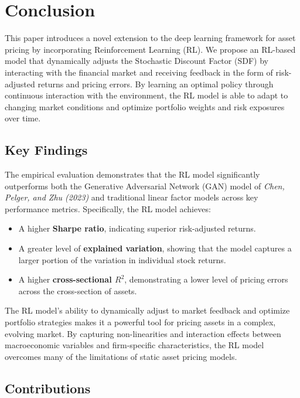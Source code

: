 \section{Conclusion}

This paper introduces a novel extension to the deep learning framework for asset pricing by incorporating Reinforcement Learning (RL). We propose an RL-based model that dynamically adjusts the Stochastic Discount Factor (SDF) by interacting with the financial market and receiving feedback in the form of risk-adjusted returns and pricing errors. By learning an optimal policy through continuous interaction with the environment, the RL model is able to adapt to changing market conditions and optimize portfolio weights and risk exposures over time.

\subsection{Key Findings}

The empirical evaluation demonstrates that the RL model significantly outperforms both the Generative Adversarial Network (GAN) model of \textit{Chen, Pelger, and Zhu (2023)} and traditional linear factor models across key performance metrics. Specifically, the RL model achieves:
\begin{itemize}
    \item A higher \textbf{Sharpe ratio}, indicating superior risk-adjusted returns.
    \item A greater level of \textbf{explained variation}, showing that the model captures a larger portion of the variation in individual stock returns.
    \item A higher \textbf{cross-sectional \( R^2 \)}, demonstrating a lower level of pricing errors across the cross-section of assets.
\end{itemize}

The RL model's ability to dynamically adjust to market feedback and optimize portfolio strategies makes it a powerful tool for pricing assets in a complex, evolving market. By capturing non-linearities and interaction effects between macroeconomic variables and firm-specific characteristics, the RL model overcomes many of the limitations of static asset pricing models.

\subsection{Contributions}

